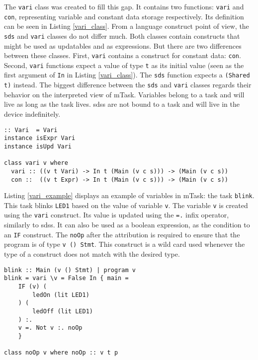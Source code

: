 The \texttt{vari} class was created to fill this gap. It contains two functions: \texttt{vari} and \texttt{con}, representing variable and constant data storage respectively. Its definition can be seen in Listing \ref{vari_class}. From a language construct point of view, the \texttt{sds} and \texttt{vari} classes do not differ much. Both classes contain constructs that might be used as updatables and as expressions. But there are two differences between these classes. First, \texttt{vari} contains a construct for constant data: \texttt{con}. Second, \texttt{vari} functions expect a value of type \texttt{t} as its initial value (seen as the first argument of \texttt{In} in Listing \ref{vari_class}). The \texttt{sds} function expects a \texttt{(Shared t)} instead. The biggest difference between the \texttt{sds} and \texttt{vari} classes regards their behavior on the interpreted view of \gls{mTask}. Variables belong to a task and will live as long as the task lives. \acp{sds} are not bound to a task and will live in the device indefinitely. 


\begin{lstlisting}[caption=The \texttt{vari} class,captionpos=b,label=vari_class]
:: Vari  = Vari
instance isExpr Vari 
instance isUpd Vari 

class vari v where
  vari :: ((v t Vari) -> In t (Main (v c s))) -> (Main (v c s)) 
  con ::  ((v t Expr) -> In t (Main (v c s))) -> (Main (v c s))
\end{lstlisting}

Listing \ref{vari_example} displays an example of variables in \gls{mTask}: the task \texttt{blink}. This task blinks \texttt{LED1} based on the value of variable \texttt{v}. The variable \texttt{v} is created using the \texttt{vari} construct. Its value is updated using the \texttt{=.} infix operator, similarly to \acp{sds}. It can also be used as a boolean expression, as the condition to an \texttt{IF} construct. The \texttt{noOp} after the attribution is required to ensure that the program is of type \texttt{v () Stmt}. This construct is a wild card used whenever the type of a construct does not match with the desired type.

\begin{lstlisting}[caption=Example of the usage of variables in mTask,captionpos=b,label=vari_example]
blink :: Main (v () Stmt) | program v
blink = vari \v = False In { main =
	IF (v) (
		ledOn (lit LED1)
	) (
		ledOff (lit LED1)
	) :.
	v =. Not v :. noOp
	}
	
class noOp v where noOp :: v t p
\end{lstlisting}

